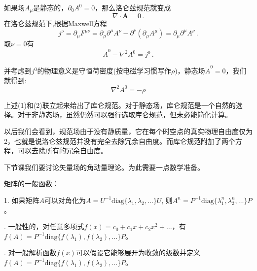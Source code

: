 \documentclass[CJK]{beamer}
\begin{document}
\begin{frame}
\bch
如果场$A_\mu$是静态的，$\partial_0 A^0 = 0$，那么洛仑兹规范就变成
\begin{equation}
\nabla \cdot \mathbf{A} = 0\, .
\end{equation}
在洛仑兹规范下,根据Maxwell方程
$$j^\nu = \partial_\mu F^{\mu\nu} = \partial_\mu \partial^\mu A^\nu - \partial^\nu (\partial_\mu A^\mu) =  \partial_\mu \partial^\mu A^\nu \, .$$
取$\nu = 0$有
$$\ddot A^0 - \nabla^2 A^0 = j^0\, .$$

并考虑到$j^0$的物理意义是守恒荷密度(按电磁学习惯写作$\rho$)，静态场$\ddot A^0=0$，我们就得到:
\begin{equation}
\nabla^2 A^0 = - \rho
\end{equation}
\ech
\end{frame}

\begin{frame}
\bch
上述(1)和(2)联立起来给出了库仑规范。对于静态场，库仑规范是一个自然的选择。对于非静态场，虽然仍然可以强行选取库仑规范，但未必能简化计算。

\skipline
以后我们会看到，规范场由于没有静质量，它在每个时空点的真实物理自由度仅为2，也就是说洛仑兹规范并没有完全去除冗余自由度。而库仑规范附加了两个方程，可以去除所有的冗余自由度。

\ech
\end{frame}

\begin{frame}
\bch
下节课我们要讨论矢量场的角动量理论。为此需要一点数学准备。
\ech
\end{frame}

\begin{frame}
\bch
矩阵的一般函数：
\skipline

1. 如果矩阵$A$可以对角化为$A = U^{-1} \mathrm{diag}\{\lambda_1, \lambda_2, \ldots\} U$, 则$A^n = P^{-1} \mathrm{diag}\{\lambda_1^n, \lambda_2^n, \ldots\} P$。

. 一般性的，对任意多项式$f(x) = c_0 + c_1 x + c_2 x^2 + \ldots $，有$f(A) =   P^{-1} \mathrm{diag}\{f(\lambda_1), f(\lambda_2), \ldots\} P$。

. 对一般解析函数$f(x)$可以假设它能够展开为收敛的级数并定义$f(A) =   P^{-1} \mathrm{diag}\{f(\lambda_1), f(\lambda_2), \ldots\} P$。


\ech
\end{frame}
\end{document}
